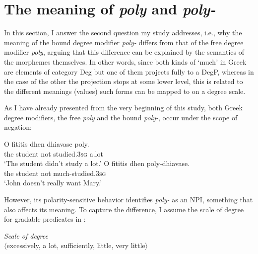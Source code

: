 \documentclass[output=paper]{langscibook}
\begin{document}
\section{The meaning of \textit{poly} and \textit{poly-}} \label{gia:sec:meanings}

In this section, I answer the second question my study addresses, i.e., why the meaning of the bound degree modifier \textit{poly-} differs from that of the free degree modifier \textit{poly}, arguing that this difference can be explained by the semantics of the morphemes themselves. In other words, since both kinds of `much' in Greek are elements of category Deg but one of them projects fully to a DegP, whereas in the case of the other the projection stops at some lower level, this is related to the different meanings (values) such forms can be mapped to on a degree scale.

 As I have already presented from the very beginning of this study, both Greek degree modifiers, the free \textit{poly} and the bound \textit{poly-}, occur under the scope of negation:

\begin{exe}
\ex\label{gia:ex33} \begin{xlist}
        \ex\label{gia:ex33a} \gll O fititis dhen dhiavase poly. \\
        the student not studied.\textsc{3sg} a.lot \\
        \trans `The student didn't study a lot.'
        \ex\label{gia:ex33b} \gll O fititis dhen poly-dhiavase. \\
        the student not much-studied.\textsc{3sg} \\
        \trans `John doesn't really want Mary.'
    \end{xlist}
\end{exe}

\noindent However, its polarity-sensitive behavior identifies \textit{poly-} as an NPI, something that also affects its meaning. To capture the difference, I assume the scale of degree for gradable predicates in :

\begin{exe}
\ex\label{gia:ex34} \textit{Scale of degree}\\
$\langle$excessively, a lot, sufficiently, little, very little$\rangle$
\end{exe}
\end{document}
